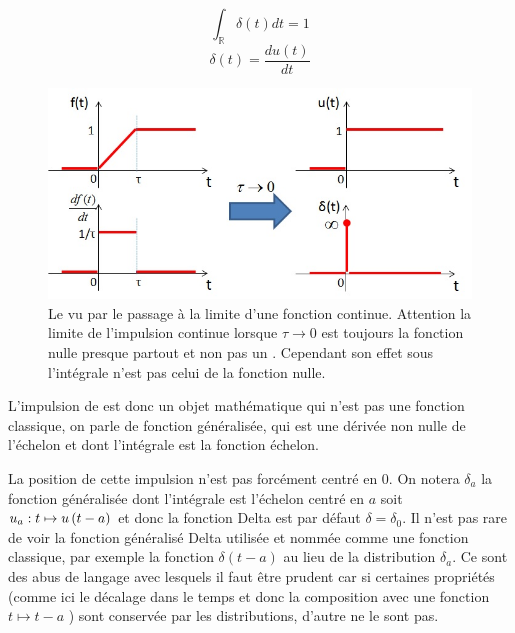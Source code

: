         \begin{figure}[htbp]
          \begin{minipage}[l]{0.4\linewidth}
          \begin{equation}\label{Dirac_aire}
            \int_{\mathbb{R}}\delta (t)dt = 1 	
          \end{equation}
	\begin{equation}\label{Dirac_derive}
          \delta (t) = \frac{du(t)}{dt}	 	
	\end{equation}
	\end{minipage} \hfill
	\begin{minipage}[r]{0.6\linewidth}
          \includegraphics[scale=0.5]{images/generation_Dirac.jpg}
   	\end{minipage}
	\vspace{0.5\baselineskip}
        
        \caption{Le \Dirac{} vu par le passage à la limite d'une
          fonction continue. Attention la limite de l'impulsion
          continue lorsque $\tau\to 0$ est toujours la fonction
          nulle presque partout et non pas un \Dirac{}. Cependant son
          effet sous l'intégrale n'est pas celui de la fonction
          nulle.}
        \label{fig:dirac}
      \end{figure}
	L'impulsion de \Dirac{} est donc un objet mathématique qui
        n'est pas une fonction classique, on parle de fonction
        généralisée, qui est une dérivée non nulle de l'échelon et
        dont l'intégrale est la fonction échelon. 

        La position de cette impulsion n'est pas forcément centré en
        0. On notera $\delta_a$ la fonction généralisée dont
        l'intégrale est l'échelon centré en $a$ soit
        $u_a : t\mapsto u\left(t-a\right)$ et donc la fonction Delta est par
      défaut $\delta = \delta_0$. Il n'est pas rare de voir la
      fonction généralisé Delta utilisée et nommée comme une fonction
      classique, par exemple \og{} la fonction $\delta(t-a)$ \fg{} au
      lieu de la distribution $\delta_a$. Ce sont des abus de langage
      avec lesquels il faut être prudent car si certaines propriétés
      (comme ici le décalage dans le temps et donc la composition avec
      une fonction $t\mapsto t-a$ ) sont conservée par les
      distributions, d'autre ne le sont pas.
        
